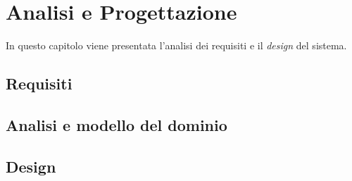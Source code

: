\chapter{Analisi e Progettazione}
\label{chapter:analysis}
In questo capitolo viene presentata l'analisi dei requisiti e il \textit{design} del sistema.

\section{Requisiti}

\section{Analisi e modello del dominio}

\section{Design}
